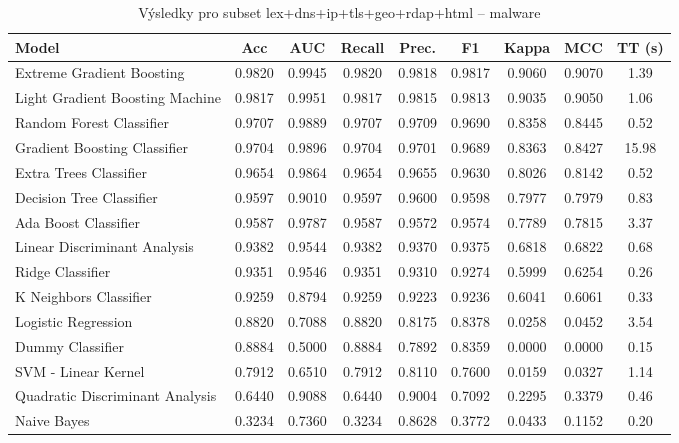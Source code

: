 \begin{table}[H]
  \centering
  \small
  \caption{Výsledky pro subset lex+dns+ip+tls+geo+rdap+html – malware}
  \begin{tabular}{|l|c|c|c|c|c|c|c|c|}
    \hline
    \textbf{Model} & \textbf{Acc} & \textbf{AUC} & \textbf{Recall} & \textbf{Prec.} & \textbf{F1} & \textbf{Kappa} & \textbf{MCC} & \textbf{TT (s)} \\
    \hline
    Extreme Gradient Boosting & 0.9820 & 0.9945 & 0.9820 & 0.9818 & 0.9817 & 0.9060 & 0.9070 & 1.39 \\
    Light Gradient Boosting Machine & 0.9817 & 0.9951 & 0.9817 & 0.9815 & 0.9813 & 0.9035 & 0.9050 & 1.06 \\
    Random Forest Classifier & 0.9707 & 0.9889 & 0.9707 & 0.9709 & 0.9690 & 0.8358 & 0.8445 & 0.52 \\
    Gradient Boosting Classifier & 0.9704 & 0.9896 & 0.9704 & 0.9701 & 0.9689 & 0.8363 & 0.8427 & 15.98 \\
    Extra Trees Classifier & 0.9654 & 0.9864 & 0.9654 & 0.9655 & 0.9630 & 0.8026 & 0.8142 & 0.52 \\
    Decision Tree Classifier & 0.9597 & 0.9010 & 0.9597 & 0.9600 & 0.9598 & 0.7977 & 0.7979 & 0.83 \\
    Ada Boost Classifier & 0.9587 & 0.9787 & 0.9587 & 0.9572 & 0.9574 & 0.7789 & 0.7815 & 3.37 \\
    Linear Discriminant Analysis & 0.9382 & 0.9544 & 0.9382 & 0.9370 & 0.9375 & 0.6818 & 0.6822 & 0.68 \\
    Ridge Classifier & 0.9351 & 0.9546 & 0.9351 & 0.9310 & 0.9274 & 0.5999 & 0.6254 & 0.26 \\
    K Neighbors Classifier & 0.9259 & 0.8794 & 0.9259 & 0.9223 & 0.9236 & 0.6041 & 0.6061 & 0.33 \\
    Logistic Regression & 0.8820 & 0.7088 & 0.8820 & 0.8175 & 0.8378 & 0.0258 & 0.0452 & 3.54 \\
    Dummy Classifier & 0.8884 & 0.5000 & 0.8884 & 0.7892 & 0.8359 & 0.0000 & 0.0000 & 0.15 \\
    SVM - Linear Kernel & 0.7912 & 0.6510 & 0.7912 & 0.8110 & 0.7600 & 0.0159 & 0.0327 & 1.14 \\
    Quadratic Discriminant Analysis & 0.6440 & 0.9088 & 0.6440 & 0.9004 & 0.7092 & 0.2295 & 0.3379 & 0.46 \\
    Naive Bayes & 0.3234 & 0.7360 & 0.3234 & 0.8628 & 0.3772 & 0.0433 & 0.1152 & 0.20 \\
    \hline
  \end{tabular}
\end{table}
\vspace{0.5cm}


